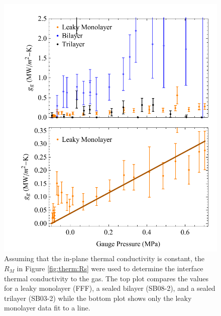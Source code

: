 \begin{figure}
	\begin{center}
	\includegraphics[scale=0.8]{Figs_Thermal/gs.pdf}
	\end{center}
	\caption[Pressure dependent interface thermal conductivity to the gas]{\label{fig:therm:gs}
		Assuming that the in-plane thermal conductivity is constant, the $R_M$ in Figure \ref{fig:therm:Rs} were used to determine the interface thermal conductivity to the gas.
		The top plot compares the values for a leaky monolayer (FFF), a sealed bilayer (SB08-2), and a sealed trilayer (SB03-2) while the bottom plot shows only the leaky monolayer data fit to a line.
	}
\end{figure}

